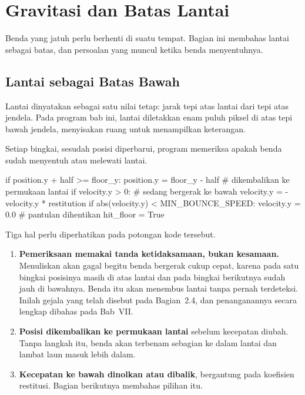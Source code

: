 \section{Gravitasi dan Batas Lantai}
\label{sec:gravitasi-lantai}

Benda yang jatuh perlu berhenti di suatu tempat. Bagian ini membahas lantai
sebagai batas, dan persoalan yang muncul ketika benda menyentuhnya.

\subsection{Lantai sebagai Batas Bawah}

Lantai dinyatakan sebagai satu nilai tetap: jarak tepi atas lantai dari tepi
atas jendela. Pada program bab ini, lantai diletakkan enam puluh piksel di
atas tepi bawah jendela, menyisakan ruang untuk menampilkan keterangan.

Setiap bingkai, sesudah posisi diperbarui, program memeriksa apakah benda
sudah menyentuh atau melewati lantai.

\begin{kodekeluaran}
if position.y + half >= floor_y:
    position.y = floor_y - half        # dikembalikan ke permukaan lantai
    if velocity.y > 0:                 # sedang bergerak ke bawah
        velocity.y = -velocity.y * restitution
        if abs(velocity.y) < MIN_BOUNCE_SPEED:
            velocity.y = 0.0           # pantulan dihentikan
    hit_floor = True
\end{kodekeluaran}

Tiga hal perlu diperhatikan pada potongan kode tersebut.

\begin{enumerate}
  \item \textbf{Pemeriksaan memakai tanda ketidaksamaan, bukan kesamaan.}
        Menuliskan  akan gagal begitu
        benda bergerak cukup cepat, karena pada satu bingkai posisinya masih di
        atas lantai dan pada bingkai berikutnya sudah jauh di bawahnya. Benda
        itu akan menembus lantai tanpa pernah terdeteksi. Inilah gejala
         yang telah disebut pada Bagian~2.4, dan
        penanganannya secara lengkap dibahas pada Bab~VII.
  \item \textbf{Posisi dikembalikan ke permukaan lantai} sebelum kecepatan
        diubah. Tanpa langkah itu, benda akan terbenam sebagian ke dalam
        lantai dan lambat laun masuk lebih dalam.
  \item \textbf{Kecepatan ke bawah dinolkan atau dibalik}, bergantung pada
        koefisien restitusi. Bagian berikutnya membahas pilihan itu.
\end{enumerate}

